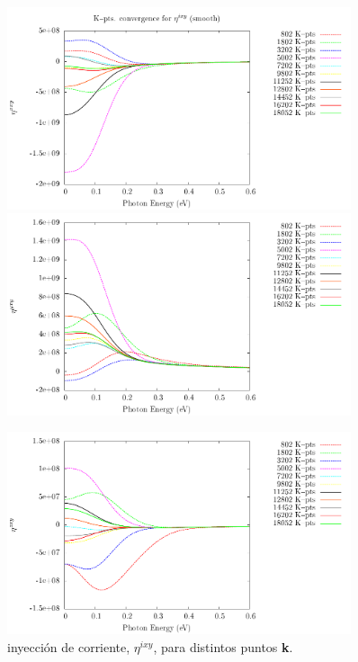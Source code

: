 \documentclass[11pt]{article}
\begin{document}
\begin{figure}[h!]
	\begin{center}
		\includegraphics[width=0.9\textwidth]{./figures/boat/res3_eta_1_sm.pdf}
		\includegraphics[width=0.9\textwidth]{./figures/boat/res3_eta_2_sm.pdf}
	\end{center}
\end{figure}

\begin{figure}[h!]
	\begin{center}
		\includegraphics[width=0.9\textwidth]{./figures/boat/res3_eta_3_sm.pdf}
	\end{center}
	\caption{inyecci\'on de corriente, $\eta^{ixy}$, para distintos puntos \textbf{k}.}
	\label{fig:eta}
\end{figure}
\end{document}
